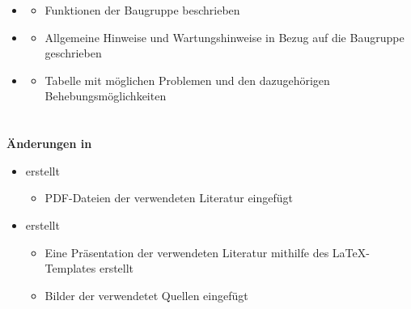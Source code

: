 \begin{itemize}
\begin{itemize}
		\item Wasserführung der Baugruppe beschrieben
		\item Pegelmessung der Baugruppe beschrieben
		\item Elektronik und Steuerung der Baugruppe erklärt
    	\end{itemize}
	\item {}
		\begin{itemize}
		\item Funktionen der Baugruppe beschrieben
	    \end{itemize}
	\item {}
		\begin{itemize}
		\item Allgemeine Hinweise und Wartungshinweise in Bezug auf die Baugruppe geschrieben
	    \end{itemize}
	\item {}
		\begin{itemize}
		\item Tabelle mit möglichen Problemen und den dazugehörigen Behebungsmöglichkeiten
    	\end{itemize}
\end{itemize}



\section{}
\textbf{Änderungen in }
\begin{itemize}
	\item {} erstellt
	\begin{itemize}
		\item PDF-Dateien der verwendeten Literatur eingefügt
	\end{itemize}
	\item {} erstellt
		\begin{itemize}
		\item Eine Präsentation der verwendeten Literatur mithilfe des LaTeX-Templates erstellt
		\item Bilder der verwendetet Quellen eingefügt
	\end{itemize}
\end{itemize}



